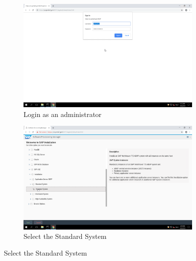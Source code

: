 \begin{figure}[!htb]\ContinuedFloat
    \begin{subfigure}{0.5\textwidth}
        \captionsetup{width=0.8\linewidth}
        \includegraphics[width=0.9\linewidth]{img/Methodologie/SAP36.png}
        \centering
        \caption{Login as an administrator}
    \end{subfigure}
    \begin{subfigure}{0.5\textwidth}
        \captionsetup{width=0.8\linewidth}
        \includegraphics[width=0.9\linewidth]{img/Methodologie/SAP35.png} 
        \centering
        \caption{Select the Standard System}
    \end{subfigure}
\end{figure}
